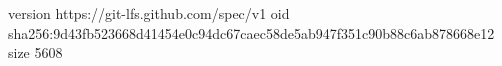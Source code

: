 version https://git-lfs.github.com/spec/v1
oid sha256:9d43fb523668d41454e0c94dc67caec58de5ab947f351c90b88c6ab878668e12
size 5608
